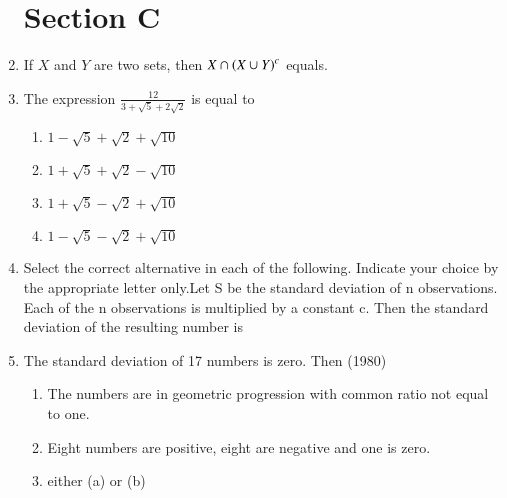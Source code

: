 \documentclass[journal,12pt,onecolumn]{IEEEtran}
\theoremstyle{remark}
\begin{document}
\begin{enumerate}
\section{Section C}
	\item If $X$ and $Y$ are two sets, then $X\cap \left(X\cup Y\right)^c$ equals.
		\hfill{}
		\begin{enumerate}
	        \end{enumerate}
	\item The expression $\frac{12}{3+\sqrt{5}+2\sqrt{2}}$ is equal to 
		\hfill{\brak{1980}}
		\begin{enumerate}
                \item $1-\sqrt{5}+\sqrt{2}+\sqrt{10}$
		\item $1+\sqrt{5}+\sqrt{2}-\sqrt{10}$
		\item $1+\sqrt{5}-\sqrt{2}+\sqrt{10}$
		\item $1-\sqrt{5}-\sqrt{2}+\sqrt{10}$
		\end{enumerate}
	\item Select the correct alternative in each of the following. Indicate your choice by the appropriate letter only.Let S be the standard deviation of n observations. Each of the n observations is multiplied by a constant c. Then the standard deviation of the resulting number is \hfill{}
		\begin{enumerate}
		\end{enumerate}
	\item The standard deviation of 17 numbers is zero. Then \hfill{(1980)}
		\begin{enumerate}
		\item The numbers are in geometric progression with common ratio not equal to one.
		\item Eight numbers are positive, eight are negative and one is zero.
		\item either (a) or (b)

\end{enumerate}
\end{enumerate}
\end{document}
